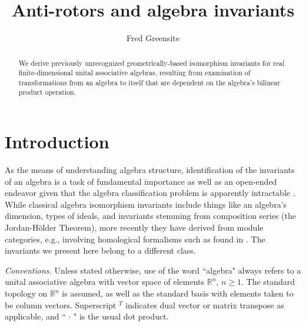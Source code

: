 \documentclass{amsart}
\theoremstyle{definition}
\numberwithin{theorem}{section}
\numberwithin{equation}{section}
\begin{document}
 

    
    \title{Anti-rotors and algebra invariants}
    
       \author{Fred Greensite}
 
       \begin{abstract} We derive previously unrecognized geometrically-based isomorphism invariants for real finite-dimensional unital associative algebras, resulting from examination of transformations from an algebra to itself that are dependent on the algebra's bilinear product operation. 
   \end{abstract}
   
    \maketitle
    

\thispagestyle{empty}
\section{Introduction}
As the means of understanding algebra structure, identification of the invariants of an algebra is a task of fundamental importance as well as an open-ended endeavor given that the algebra classification problem is apparently intractable \cite{eom:2024,belitskii:2005}.  While classical algebra isomorphism invariants include things like an algebra's dimension, types of ideals, and invariants stemming from composition series (the Jordan-H\"older Theorem), more recently they have derived from module categories, e.g., involving homological formalisms such as found in \cite{hochschild:1945,gerstenhaber:1964,loday:1998}.  The invariants we present here belong to a different class.  

\bigskip

{\it Conventions.} Unless stated otherwise, use of the word ``algebra" always refers to a unital associative algebra with vector space of elements $\mathbb{R}^n$, $n\ge 1$.  The standard topology on $\mathbb{R}^n$ is assumed, as well as the standard basis with elements taken to be column vectors.  Superscript $^T$ indicates dual vector or matrix transpose as applicable, and ``$\,\cdot\,$" is the usual dot product.  
\end{document}
